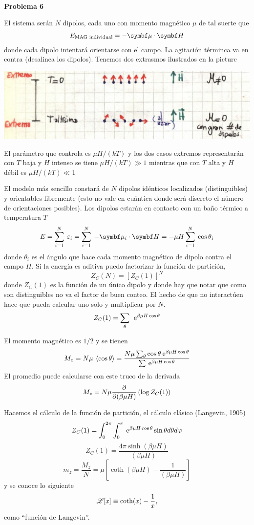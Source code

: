 \documentclass[10pt,oneside]{CBFT_book}
\begin{document}
\begin{ejemplo}{\bf Problema 6}

El sistema serán $N$ dipolos, cada uno con momento magnético $\mu$ de tal suerte que 
\[
	E_{\text{MAG individual}} = - \vb{\mu} \cdot \vb{H}
\]
donde cada dipolo intentará orientarse con el campo.
La agitación términca va en contra (desalinea los dipolos). Tenemos dos extrasmos ilustrados
en la picture

\includegraphics[scale=0.5]{images/1606329484.jpg}

El parámetro que controla es $\mu H / (k T)$ y los dos casos extremos representarán 
con $T$ baja y $H$ intenso se tiene $\mu H / (k T) \gg 1$ mientras que con $T$ alta y $H$ débil 
es $\mu H / (k T) \ll 1 $

El modelo más sencillo constará de $N$ dipolos idénticos localizados (distinguibles) y orientables
libremente (esto no vale en cuántica donde será discreto el número de orientaciones posibles).
Los dipolos estarán en contacto con un baño térmico a temperatura $T$
\[
	E = \sum_{i=1}^N \: \vare_i = \sum_{i=1}^N \: -\vb{\mu}_i \cdot \vb{H} =
	- \mu H \sum_{i=1}^N \: \cos\theta_i
\]
donde $\theta_i$ es el ángulo que hace cada momento magnético de dipolo contra el campo $H$.
Si la energía es aditiva puedo factorizar la función de partición,
\[
	Z_C(N) =  [ Z_C(1) ]^N
\]
donde $Z_C(1)$ es la función de un único dipolo y donde hay que notar que como son distinguibles
no va el factor de buen conteo.
El hecho de que no interactúen hace que pueda calcular uno solo y multiplicar por $N$.
\[
	Z_C(1) = \sum_\theta \: \:\mathrm{e}^{\beta \mu H \cos \theta }
\]

El momento magnético es $1/2$ y se tienen
\[
	M_z = N \mu \:\left\langle  \cos \theta  \right\rangle = 
	\frac{ N \mu \sum_\theta \cos \theta \:\mathrm{e}^{ \beta \mu H \cos \theta} }
	{ \sum \:\mathrm{e}^{ \beta \mu H \cos \theta} }
\]
El promedio puede calcularse con este truco de la derivada
\[
	M_z = N \mu \frac{\partial^{\hspace{-0.05em}} {}}{\partial {(\beta \mu H)}^{\hspace{-0.05em}}}\left( \log Z_C(1) \right)
\]

Hacemos el cálculo de la función de partición, el cálculo clásico (Langevin, 1905)
\[
	Z_C(1) = \int_0^{2\pi} \int_0^\pi \:\mathrm{e}^{ \beta \mu H \cos \theta} \sin\theta d\theta d\varphi
\]
\[
	Z_C(1) = \frac{ 4 \pi \sinh (\beta \mu H)}{ (\beta \mu H) }
\]
\[
	m_z = \frac{M_z}{N} = \mu \left[ \coth (\beta \mu H) - \frac{1}{(\beta \mu H)} \right]
\]
y se conoce lo siguiente
\[
	\mathscr{L} [x] \equiv \coth(x) - \frac{1}{x},
\]
como ``función de Langevin''.


\end{ejemplo}
\end{document}
